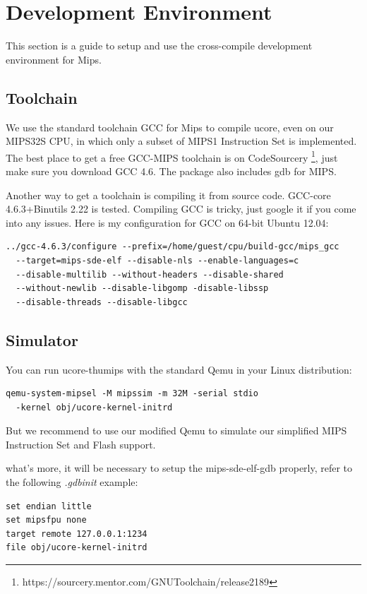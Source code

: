 \documentclass[a4paper]{article}
\begin{document}
\section{Development Environment}
This section is a guide to setup and use the cross-compile development environment for Mips.

\subsection{Toolchain}
We use the standard toolchain GCC for Mips to compile ucore, even on our 
MIPS32S CPU, in which only a subset of MIPS1 Instruction Set is implemented.
The best place to get a free GCC-MIPS toolchain is on CodeSourcery
\footnote{https://sourcery.mentor.com/GNUToolchain/release2189}, just make sure you download GCC 4.6. The package also includes gdb for MIPS.

Another way to get a toolchain is compiling it from source code. GCC-core 4.6.3+Binutils 2.22 is tested. Compiling GCC is tricky, just google it if you
come into any issues. Here is my configuration for GCC on 64-bit Ubuntu 12.04:

\begin{verbatim}
../gcc-4.6.3/configure --prefix=/home/guest/cpu/build-gcc/mips_gcc 
  --target=mips-sde-elf --disable-nls --enable-languages=c  
  --disable-multilib --without-headers --disable-shared
  --without-newlib --disable-libgomp -disable-libssp 
  --disable-threads --disable-libgcc
\end{verbatim}


\subsection{Simulator}
You can run ucore-thumips with the standard Qemu in your Linux distribution:

\begin{verbatim}
qemu-system-mipsel -M mipssim -m 32M -serial stdio 
  -kernel obj/ucore-kernel-initrd
\end{verbatim}

But we recommend to use our modified Qemu to simulate our simplified MIPS Instruction Set
and Flash support. 

what's more, it will be necessary to setup the mips-sde-elf-gdb properly, refer to 
the following \emph{.gdbinit} example:

\begin{verbatim}
set endian little
set mipsfpu none
target remote 127.0.0.1:1234
file obj/ucore-kernel-initrd
\end{verbatim}
\end{document}
